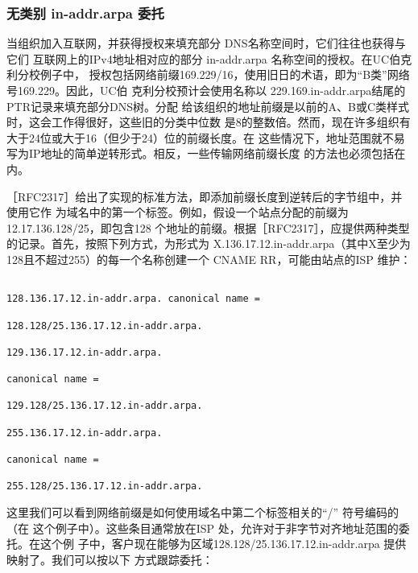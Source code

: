 \subsubsection{无类别 in-addr.arpa 委托}

当组织加入互联网，并获得授权来填充部分 DNS名称空间时，它们往往也获得与它们
互联网上的IPv4地址相对应的部分 in-addr.arpa 名称空间的授权。在UC伯克利分校例子中，
授权包括网络前缀169.229/16，使用旧日的术语，即为“B类”网络号169.229。因此，UC伯
克利分校预计会使用名称以 229.169.in-addr.arpa结尾的PTR记录来填充部分DNS树。分配
给该组织的地址前缀是以前的A、B或C类样式时，这会工作得很好，这些旧的分类中位数
是8的整数倍。然而，现在许多组织有大于24位或大于16（但少于24）位的前缀长度。在
这些情况下，地址范围就不易写为IP地址的简单逆转形式。相反，一些传输网络前缀长度
的方法也必须包括在内。

［RFC2317］给出了实现的标准方法，即添加前缀长度到逆转后的字节组中，并使用它作
为域名中的第一个标签。例如，假设一个站点分配的前缀为12.17.136.128/25，即包含128
个地址的前缀。根据［RFC2317］，应提供两种类型的记录。首先，按照下列方式，为形式为
X.136.17.12.in-addr.arpa（其中X至少为128且不超过255）的每一个名称创建一个 CNAME
RR，可能由站点的ISP 维护：

\begin{verbatim}
    
128.136.17.12.in-addr.arpa. canonical name =

128.128/25.136.17.12.in-addr.arpa.

129.136.17.12.in-addr.arpa.

canonical name =

129.128/25.136.17.12.in-addr.arpa.

255.136.17.12.in-addr.arpa.

canonical name =

255.128/25.136.17.12.in-addr.arpa.
\end{verbatim}

这里我们可以看到网络前缀是如何使用域名中第二个标签相关的“/” 符号编码的（在
这个例子中）。这些条目通常放在ISP 处，允许对于非字节对齐地址范围的委托。在这个例
子中，客户现在能够为区域128.128/25.136.17.12.in-addr.arpa 提供映射了。我们可以按以下
方式跟踪委托：

